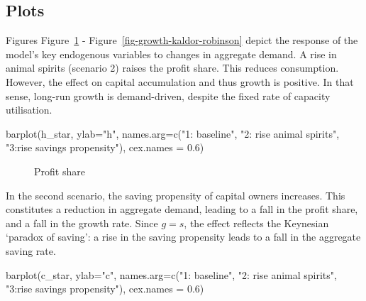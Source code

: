 \documentclass[
  letterpaper,
  DIV=11,
  numbers=noendperiod]{scrreprt}
\newenvironment{Shaded}{\begin{snugshade}}{\end{snugshade}}
\newcommand{\AttributeTok}[1]{\textcolor[rgb]{0.40,0.45,0.13}{#1}}
\newcommand{\FloatTok}[1]{\textcolor[rgb]{0.68,0.00,0.00}{#1}}
\newcommand{\FunctionTok}[1]{\textcolor[rgb]{0.28,0.35,0.67}{#1}}
\newcommand{\NormalTok}[1]{\textcolor[rgb]{0.00,0.23,0.31}{#1}}
\newcommand{\StringTok}[1]{\textcolor[rgb]{0.13,0.47,0.30}{#1}}
\begin{document}
\subsection{Plots}\label{plots-4}

Figures Figure~\ref{fig-profshare-kaldor-robinson} -
Figure~\ref{fig-growth-kaldor-robinson} depict the response of the
model's key endogenous variables to changes in aggregate demand. A rise
in animal spirits (scenario 2) raises the profit share. This reduces
consumption. However, the effect on capital accumulation and thus growth
is positive. In that sense, long-run growth is demand-driven, despite
the fixed rate of capacity utilisation.

\begin{Shaded}
\begin{Highlighting}[]
\FunctionTok{barplot}\NormalTok{(h\_star, }\AttributeTok{ylab=}\StringTok{"h"}\NormalTok{, }\AttributeTok{names.arg=}\FunctionTok{c}\NormalTok{(}\StringTok{"1: baseline"}\NormalTok{, }\StringTok{"2: rise animal spirits"}\NormalTok{, }\StringTok{"3:rise savings propensity"}\NormalTok{), }\AttributeTok{cex.names =} \FloatTok{0.6}\NormalTok{)}
\end{Highlighting}
\end{Shaded}

\begin{figure}[H]


\caption{\label{fig-profshare-kaldor-robinson}Profit share}

\end{figure}%

In the second scenario, the saving propensity of capital owners
increases. This constitutes a reduction in aggregate demand, leading to
a fall in the profit share, and a fall in the growth rate. Since
\(g=s\), the effect reflects the Keynesian `paradox of saving': a rise
in the saving propensity leads to a fall in the aggregate saving rate.

\begin{Shaded}
\begin{Highlighting}[]
\FunctionTok{barplot}\NormalTok{(c\_star, }\AttributeTok{ylab=}\StringTok{"c"}\NormalTok{, }\AttributeTok{names.arg=}\FunctionTok{c}\NormalTok{(}\StringTok{"1: baseline"}\NormalTok{, }\StringTok{"2: rise animal spirits"}\NormalTok{, }\StringTok{"3:rise savings propensity"}\NormalTok{), }\AttributeTok{cex.names =} \FloatTok{0.6}\NormalTok{)}
\end{Highlighting}
\end{Shaded}
\end{document}
